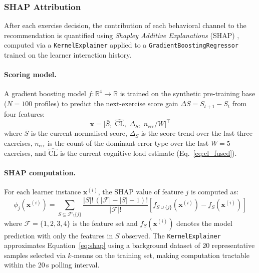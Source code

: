 \documentclass[ASNA,twocolumn]{USG} %
\begin{document}
\subsubsection{SHAP Attribution}

After each exercise decision, the contribution of each behavioral
channel to the recommendation is quantified using
\emph{Shapley Additive Explanations} (SHAP) \cite{Lundberg2017},
computed via a \texttt{KernelExplainer} applied to a
\texttt{GradientBoostingRegressor} trained on the learner interaction
history.

\paragraph{Scoring model.}
A gradient boosting model $f: \mathbb{R}^4 \to \mathbb{R}$ is trained
on the synthetic pre-training base ($N{=}100$ profiles) to predict
the next-exercise score gain $\Delta S = S_{t+1} - S_t$ from four
features:
\begin{equation}
\label{eq:shap_features}
\mathbf{x} = \bigl[
  \bar{S},\;
  \widehat{\text{CL}},\;
  \Delta_S,\;
  n_{\text{err}}/W
\bigr]^\top
\end{equation}
where $\bar{S}$ is the current normalised score, $\Delta_S$ is the
score trend over the last three exercises, $n_{\text{err}}$ is the
count of the dominant error type over the last $W{=}5$ exercises,
and $\widehat{\text{CL}}$ is the current cognitive load estimate
(Eq.~\eqref{eq:cl_fused}).

\paragraph{SHAP computation.}
For each learner instance $\mathbf{x}^{(i)}$, the SHAP value of
feature $j$ is computed as:
\begin{equation}
\label{eq:shap}
\phi_j(\mathbf{x}^{(i)}) =
\sum_{S \subseteq \mathcal{F} \setminus \{j\}}
\frac{|S|!\,(|\mathcal{F}|-|S|-1)!}{|\mathcal{F}|!}
\left[
  f_{S \cup \{j\}}(\mathbf{x}^{(i)}) - f_S(\mathbf{x}^{(i)})
\right]
\end{equation}
where $\mathcal{F} = \{1,2,3,4\}$ is the feature set and
$f_S(\mathbf{x}^{(i)})$ denotes the model prediction with only the
features in $S$ observed.
The \texttt{KernelExplainer} approximates
Equation~\eqref{eq:shap} using a background dataset of 20
representative samples selected via $k$-means on the training set,
making computation tractable within the 20\,s polling interval.
\end{document}
